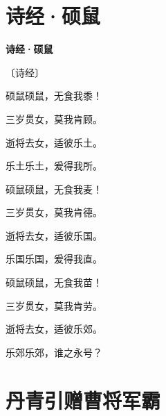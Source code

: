 \documentclass[12pt,UTF-8,openany,fontset=none]{ctexbook}
\begin{document}
\vspace{8pt}
\clearpage

\section{诗经·硕鼠}


\begin{center}
    {\bfseries 诗经·硕鼠}

    \vspace{18pt}

    \begin{large}\xuwen
        〔诗经〕
    \end{large}

\end{center}

    \vspace{18pt}  %

\begin{center}
    \begin{Large}

        硕鼠硕鼠，无食我黍！

        三岁贯女，莫我肯顾。

        逝将去女，适彼乐土。

        乐土乐土，爰得我所。

        \vspace{18pt}  %

        硕鼠硕鼠，无食我麦！

        三岁贯女，莫我肯德。

        逝将去女，适彼乐国。

        乐国乐国，爰得我直。

        \vspace{18pt}  %

        硕鼠硕鼠，无食我苗！

        三岁贯女，莫我肯劳。

        逝将去女，适彼乐郊。

        乐郊乐郊，谁之永号？

    \end{Large}

\end{center}

\vspace{8pt}
\clearpage

\section{丹青引赠曹将军霸}
\end{document}
